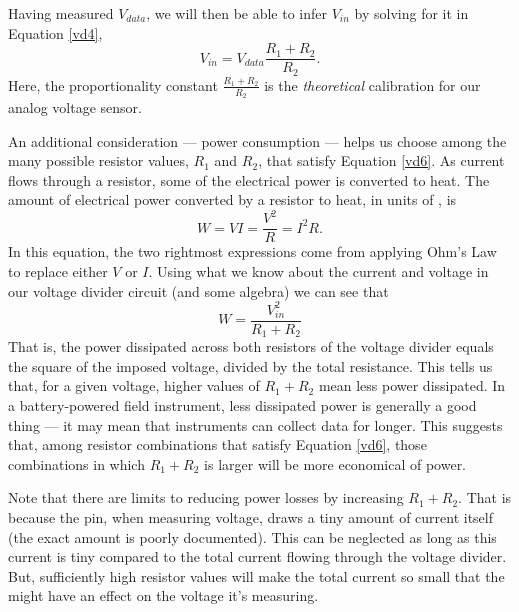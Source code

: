 Having measured $V_{data}$, we will then be able to infer $V_{in}$ by solving for it in Equation \ref{vd4},
\begin{equation}\label{vd7}
V_{in} = V_{data} \frac{R_1+R_2}{R_2}.
\end{equation}
Here, the proportionality constant $\frac{R_1+R_2}{R_2}$ is the \emph{theoretical} calibration for our analog voltage sensor.

An additional consideration --- power consumption --- helps us choose among the many possible resistor values, $R_1$ and $R_2$, that satisfy Equation \ref{vd6}. 
As current flows through a resistor, some of the electrical power is converted to heat.
The amount of electrical power converted by a resistor to heat, in units of , is
\begin{equation}\label{watts}
W = V I = \frac{V^2}{R} = I^2 R.
\end{equation} 
In this equation, the two rightmost expressions come from applying Ohm's Law to replace either $V$ or $I$.
Using what we know about the current and voltage in our voltage divider circuit (and some algebra) we can see that
\begin{equation}\label{watts2}
W = \frac{V_{in}^2}{R_1+R_2}
\end{equation}
That is, the power dissipated across both resistors of the voltage divider equals the square of the imposed voltage, divided by the total resistance.
This tells us that, for a given voltage, higher values of $R_1+R_2$ mean less power dissipated. 
In a battery-powered field instrument, less dissipated power is generally a good thing --- it may mean that instruments can collect data for longer.
This suggests that, among resistor combinations that satisfy  Equation \ref{vd6}, those combinations in which $R_1+R_2$ is larger will be more economical of power.

Note that there are limits to reducing power losses by increasing $R_1+R_2$.
That is because the \adc pin, when measuring voltage, draws a tiny amount of current itself (the exact amount is poorly documented).
This can be neglected as long as this current is tiny compared to the total current flowing through the voltage divider. 
But, sufficiently high resistor values will make the total current so small that the \adc might have an effect on the voltage it's measuring.


